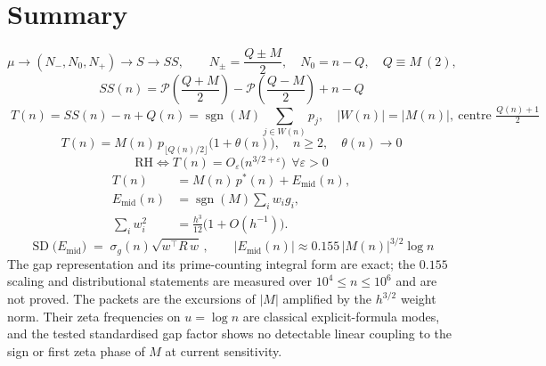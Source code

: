 \documentclass[11pt]{amsart}
\numberwithin{equation}{section}
\theoremstyle{plain}
\theoremstyle{definition}
\theoremstyle{remark}
\newcommand{\mob}{\mu}
\newcommand{\Mert}{M}
\newcommand{\Sq}{Q}
\newcommand{\PS}{\mathcal P}
\begin{document}
\section{Summary}
\label{sec:summary}

\begin{equation}
\label{eq:summary-map}
\mob \longrightarrow (N_-,N_0,N_+) \longrightarrow S \longrightarrow SS,
\qquad
N_\pm=\frac{\Sq\pm\Mert}2,\quad N_0=n-\Sq,\quad \Sq\equiv\Mert\ (2),
\end{equation}
\begin{equation}
\label{eq:summary-closed}
\boxed{\;
SS(n)=\PS\!\left(\frac{\Sq+\Mert}2\right)-\PS\!\left(\frac{\Sq-\Mert}2\right)+n-\Sq \;}
\end{equation}
\begin{equation}
\label{eq:summary-block}
\boxed{\;T(n)=SS(n)-n+\Sq(n)=\operatorname{sgn}(\Mert)\!\!\sum_{j\in W(n)}\!\!p_j,
\quad |W(n)|=|\Mert(n)|,\ \text{centre } \tfrac{\Sq(n)+1}2 \;}
\end{equation}
\begin{equation}
\label{eq:summary-scale}
\boxed{\;T(n)=\Mert(n)\,p_{\lfloor \Sq(n)/2\rfloor}\bigl(1+\theta(n)\bigr),\quad n\ge2,\quad \theta(n)\to0\;}
\end{equation}
\begin{equation}
\label{eq:summary-rh}
\boxed{\;\mathrm{RH}\iff T(n)=O_\varepsilon\bigl(n^{3/2+\varepsilon}\bigr)\ \ \forall\varepsilon>0\;}
\end{equation}
\begin{equation}
\label{eq:summary-residual}
\boxed{\begin{aligned}
T(n)&=\Mert(n)\,p^{*}(n)+E_{\mathrm{mid}}(n),\\
E_{\mathrm{mid}}(n)&=\operatorname{sgn}(\Mert)\sum_i w_i g_i,\\
\sum_i w_i^2&=\frac{h^3}{12}\bigl(1+O(h^{-1})\bigr).
\end{aligned}}
\end{equation}
\begin{equation}
\label{eq:summary-sd}
\boxed{\;\operatorname{SD}\bigl(E_{\mathrm{mid}}\bigr)\;=\;\sigma_g(n)\sqrt{w^{\!\top}\!R\,w}\,,
\qquad
|E_{\mathrm{mid}}(n)|\approx0.155\,|\Mert(n)|^{3/2}\log n\;}
\end{equation}
The gap representation and its prime-counting integral form are exact; the
$0.155$ scaling and distributional statements are measured over
$10^{4}\le n\le10^{6}$ and are not proved. The packets are the excursions of
$|M|$ amplified by the $h^{3/2}$ weight norm. Their zeta frequencies on
$u=\log n$ are classical explicit-formula modes, and the tested standardised
gap factor shows no detectable linear coupling to the sign or first zeta phase
of $M$ at current sensitivity.
\end{document}
